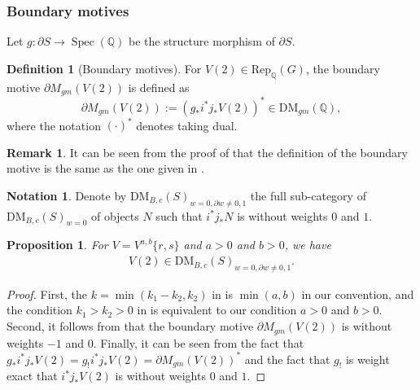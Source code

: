 \documentclass[11pt, a4paper]{amsart}
\theoremstyle{plain}
\newtheorem{proposition}[theorem]{Proposition}
\theoremstyle{definition}
\newtheorem{definition}[theorem]{Definition}
\newtheorem{remark}[theorem]{Remark}
\newtheorem{notation}[theorem]{Notation}
\numberwithin{equation}{section}
\def\QQ{\mathbb{Q}}
\DeclareMathOperator{\Spec}{Spec}
\begin{document}
\subsubsection{Boundary motives}

 Let $g \colon \partial S \rightarrow \Spec (\QQ)$ be the structure morphism of $\partial S$.
\begin{definition}[Boundary motives]
    For $V(2) \in \mathrm{Rep}_{\QQ}(G)$, the boundary motive $\partial M_{gm}(V(2))$ is defined as 
    \begin{equation*}
        \partial M_{gm}(V(2)) := (g_{*}i^{*}j_{*}V(2))^{*} \in \mathrm{DM}_{gm}(\QQ), 
    \end{equation*}
    where the notation $(\cdot)^{*}$ denotes taking dual. 
\end{definition}

\begin{remark}
    It can be seen from the proof of \cite[Corollary 3.10]{Wild_ChowII_20} that the definition of the boundary motive is the same as the one given in \cite[Definition 2.1]{Wild_boundary05}. 
\end{remark}

\begin{notation}
    Denote by $\mathrm{DM}_{B, c}(S)_{w = 0, \partial w \neq 0, 1}$ the full sub-category of $\mathrm{DM}_{B, c}(S)_{w = 0}$ of objects $N$ such that $i^{*}j_{*}N$ is without weights $0$ and $1$. 
\end{notation}

\begin{proposition}
\label{Prop: boundary weight}
For $V = V^{a, b}\{r, s\}$ and $a > 0$ and $b > 0$, we have 
\begin{align*}
    V(2) \in \mathrm{DM}_{B, c}(S)_{w = 0, \partial w \neq 0, 1}. 
\end{align*}
\end{proposition}

\begin{proof}
    First, the $k = \min(k_1 - k_2, k_2)$ in \cite[Page 21]{Wild_09} is $\min(a, b)$ in our convention, and the condition $k_1 > k_2 > 0$ in \cite{Wild_09} is equivalent to our condition $a > 0$ and $b > 0$. Second, it follows from \cite[Theorem 3.8]{Wild_15} that the boundary motive $\partial M_{gm}(V(2))$ is without weights $-1$ and $0$. Finally, it can be seen from the fact that $g_{*}i^{*}j_{*}V(2) = g_{!}i^{*}j_{*}V(2) = \partial M_{gm}(V(2))^{*}$ and the fact that $g_{!}$ is weight exact \cite[Th\'{e}or\`{e}me 3.3(i)]{Hebert10} that $i^{*}j_{*}V(2)$ is without weights $0$ and $1$. 
\end{proof}
\end{document}
